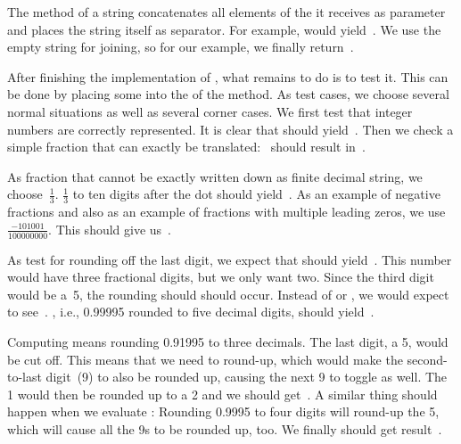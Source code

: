 The method  of a string concatenates all elements of the  it receives as parameter and places the string itself as separator.
For example,  would yield~.
We use the empty string for joining, so for our example, we finally return~.

After finishing the implementation of , what remains to do is to test it.
This can be done by placing some  into the  of the method.
As test cases, we choose several normal situations as well as several corner cases.
We first test that integer numbers are correctly represented.
It is clear that  should yield~.
Then we check a simple fraction that can exactly be translated:~ should result in~.

%

As fraction that cannot be exactly written down as finite decimal string, we choose~$\frac{1}{3}$.
$\frac{1}{3}$ to ten digits after the dot should yield~.
As an example of negative fractions and also as an example of fractions with multiple leading zeros, we use~$\frac{-101001}{100000000}$.
This should give us~.

As test for rounding off the last digit, we expect that  should yield~.
This number would have three fractional digits, but we only want two.
Since the third digit would be a~5, the rounding should should occur.
Instead of  or , we would expect to see~.
, i.e., 0.99995 rounded to five decimal digits, should yield~.

Computing  means rounding 0.91995 to three decimals.
The last digit, a 5, would be cut off.
This means that we need to round-up, which would make the second-to-last digit~(9) to also be rounded up, causing the next 9 to toggle as well.
The 1 would then be rounded up to a 2 and we should get~.
A similar thing should happen when we evaluate :
Rounding 0.9995 to four digits will round-up the 5, which will cause all the 9s to be rounded up, too.
We finally should get result~.

